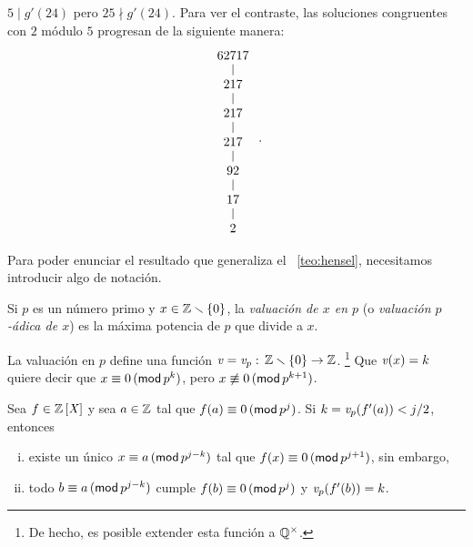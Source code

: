 \begin{ejemHensel}
	$5\mid g'(24)$ pero $25\nmid g'(24)$.
	Para ver el contraste, las soluciones congruentes con $2$
	m\'odulo $5$ progresan de la siguiente manera:
	\begin{displaymath}
		\begin{tikzcd}[row sep=small]
			62717 \\
			217 \arrow[u,-] \\
			217 \arrow[u,-] \\
			217 \arrow[u,-] \\
			92 \arrow[u,-] \\
			17 \arrow[u,-] \\
			2 \arrow[u,-]
		\end{tikzcd}
		\dispstop
	\end{displaymath}
\end{ejemHensel}

Para poder enunciar el resultado que generaliza el \teoname~\ref{teo:hensel},
necesitamos introducir algo de notaci\'on.

\begin{defHensel}\label{def:valuacion}
	Si $p$ es un n\'umero primo y $x\in\Enteros\setmin\{0\}$,
	la \emph{valuaci\'on de $x$ en $p$}
	(o \emph{valuaci\'on $p$-\'adica de $x$}) es la m\'axima potencia
	de $p$ que divide a $x$.
\end{defHensel}

\begin{obsHensel}\label{obs:valuacion}
	La valuaci\'on en $p$ define una funci\'on
	\begin{math}
		\valuacion=\valuacion[p]:\,
			\Enteros\setmin\{0\}\rightarrow\Enteros
	\end{math}.%
	\footnote{
		De hecho, es posible extender esta funci\'on
		a $\Unidades\Racionales$.
	}
	Que $\valuacion(x)=k$ quiere decir que $x\equiv 0\tmodulo[p^k]$,
	pero $x\not\equiv 0\tmodulo[p^{k+1}]$.
\end{obsHensel}

\begin{teoHensel}\label{teo:hensel:plus}
	Sea $f\in\polinomios\Enteros$ y sea $a\in\Enteros$ tal que
	$f(a)\equiv 0\tmodulo[p^j]$.
	Si $k=\valuacion[p](f'(a))<j/2$, entonces
	\begin{enumerate}[(i)]
		\item\label{item:hensel:plus:mejora}
			existe un \'unico $x\equiv a\tmodulo[p^{j-k}]$
			tal que $f(x)\equiv 0\tmodulo[p^{j+1}]$,
			sin embargo,
		\item\label{item:hensel:plus:perdida}
			todo $b\equiv a\tmodulo[p^{j-k}]$ cumple
			$f(b)\equiv 0\tmodulo[p^j]$ y
			$\valuacion[p](f'(b))=k$.
	\end{enumerate}
\end{teoHensel}

